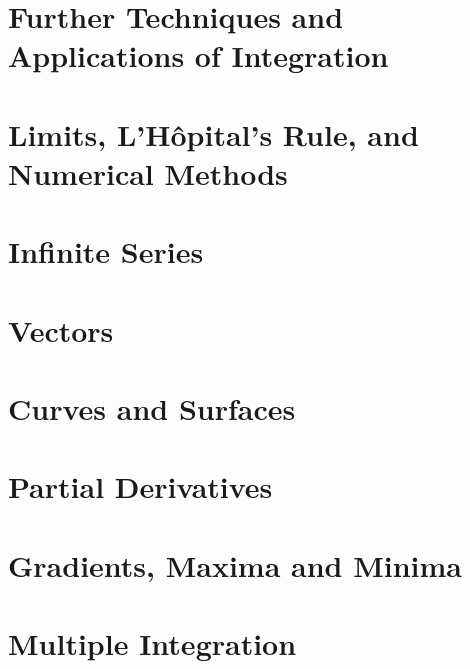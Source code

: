 \documentclass[11pt]{article}
\begin{document}
\section{Further Techniques and Applications of Integration}
\section{Limits, L'H\^{o}pital's Rule, and Numerical Methods}
\section{Infinite Series}
\section{Vectors}
\section{Curves and Surfaces}
\section{Partial Derivatives}
\section{Gradients, Maxima and Minima}
\section{Multiple Integration}
\end{document}
